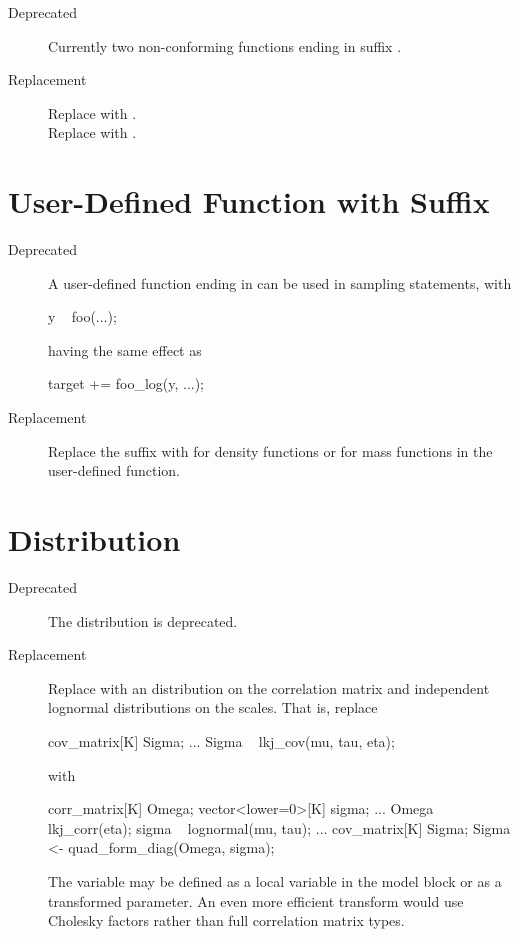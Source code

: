 \begin{description}
\item[Deprecated]  Currently two non-conforming functions ending in
  suffix .
\item[Replacement] Replace  with
  .  
\\[4pt]
Replace  with .
\end{description}

\section{User-Defined Function with  Suffix}

\begin{description}
\item[Deprecated] A user-defined function ending in  can
  be used in sampling statements, with
%
\begin{stancode}
y ~ foo(...);
\end{stancode}
%
having the same effect as 
%
\begin{stancode}
target += foo_log(y, ...);
\end{stancode}
\item[Replacement]
Replace the  suffix with  for
density functions or  for mass functions in the
user-defined function.
\end{description}

\section{ Distribution}

\begin{description}
\item[Deprecated]The distribution  is deprecated.
\item[Replacement] Replace  with an
   distribution on the correlation matrix and
  independent lognormal distributions on the scales.  That is,
  replace
\begin{stancode}
cov_matrix[K] Sigma;
...
Sigma ~ lkj_cov(mu, tau, eta);
\end{stancode}
  with
\begin{stancode}
corr_matrix[K] Omega;
vector<lower=0>[K] sigma;
...
Omega ~ lkj_corr(eta);
sigma ~ lognormal(mu, tau);
...
cov_matrix[K] Sigma;
Sigma <- quad_form_diag(Omega, sigma);
\end{stancode}
The variable  may be defined as a local variable in the
model block or as a transformed parameter.  An even more efficient
transform would use Cholesky factors rather than full correlation
matrix types.
\end{description}


